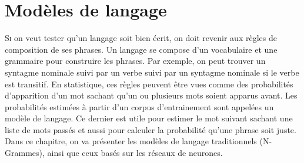 \documentclass{KodeBook}
\begin{document}
		\mainmatter
	
\fi
\chapter{Modèles de langage}

\begin{introduction}
	\lettrine{S}{i} on veut tester qu'un langage soit bien écrit, on doit revenir aux règles de composition de ses phrases.
	Un langage se compose d'un vocabulaire et une grammaire pour construire les phrases.
	Par exemple, on peut trouver un syntagme nominale suivi par un verbe suivi par un syntagme nominale si le verbe est transitif.
	En statistique, ces règles peuvent être vues comme des probabilités d'apparition d'un mot sachant qu'un ou plusieurs mots soient apparus avant. 
	Les probabilités estimées à partir d'un corpus d'entrainement sont appelées un modèle de langage. 
	Ce dernier est utile pour estimer le mot suivant sachant une liste de mots passés et aussi pour calculer la probabilité qu'une phrase soit juste.
	Dans ce chapitre, on va présenter les modèles de langage traditionnels (N-Grammes), ainsi que ceux basés sur les réseaux de neurones.
\end{introduction} 
\end{document}
